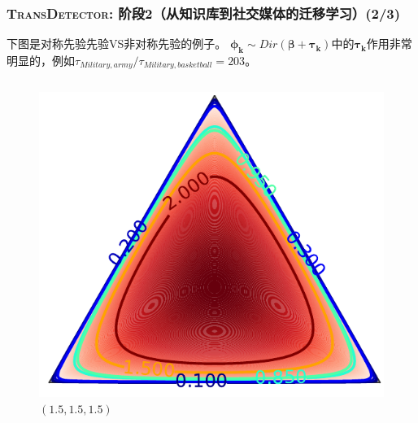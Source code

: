 \begin{frame}
\frametitle{\noindent \textsc{TransDetector}: 阶段2（从知识库到社交媒体的迁移学习）(2/3)}	

下图是对称先验先验VS非对称先验的例子。
\(\bm{\phi_k} \sim Dir(\bm{\beta}+ \bm{\tau_k})\)中的\(\bm{\tau_k}\)作用非常明显的，例如\(\tau_{Military,army}/\tau_{Military,basketball}=203\)。
\vspace{-5mm}
\begin{columns}
\begin{column}{0.48\paperwidth}
	\begin{figure}
		\caption{$(1.5,1.5,1.5)$}
		\includegraphics[width=0.4\paperwidth]{img/croppedDirichletGraph2.pdf}	
	\end{figure}

\end{column}


\end{columns}
\end{frame}
